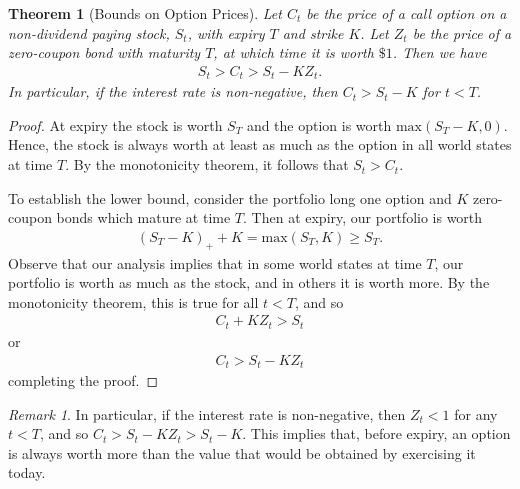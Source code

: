 \documentclass[12pt]{article}
\theoremstyle{plain}
\newtheorem{theorem}{Theorem}
\theoremstyle{definition}
\theoremstyle{remark}
\newtheorem*{remark}{Remark}
\numberwithin{equation}{section}  %
\begin{document}
\begin{theorem}[Bounds on Option Prices]\label{thm:bound-op-prices}
	Let $C_t$ be the price of a call option on a non-dividend paying stock, 
	$S_t$, with
	expiry $T$ and strike $K$. Let $Z_t$ be the price of a zero-coupon bond 
	with maturity $T$, at which time
	it is worth $\$1$. 
	Then we have
	\begin{equation*}
		\begin{split}
			S_{t} > C_{t} > S_{t} - K Z_{t}.
		\end{split}
	\end{equation*}
	In particular, if the interest rate is non-negative, then $C_{t} >
	S_{t} - K$ for $t < T$. 
\end{theorem}
\begin{proof}
	At expiry the stock is worth $S_{T}$ and the option is worth
	$\text{max}(S_{T} - K, 0)$. Hence, the stock is always worth at least as 
	much
	as the option in all world states at time $T$. By the monotonicity theorem, 
	it follows
	that $S_{t} > C_{t}$. 

	To establish the lower bound, consider the portfolio long one option and 
	$K$ zero-coupon bonds which
	mature at time $T$. Then at expiry, our portfolio is worth
	\begin{equation*}
		\begin{split}
			{(S_{T} - K)}_{+} + K =  \text{max}(S_{T}, K) \ge S_{T}.
		\end{split}
	\end{equation*}
	Observe that our analysis implies that in some world states at time $T$, 
	our portfolio is worth as much as the stock, and in others it is worth 
	more. By the monotonicity theorem, this is true for all $t < T$, and so
	\begin{equation*}
		\begin{split}
			C_{t} + K Z_{t} > S_{t} 
		\end{split}
	\end{equation*}
	or
	\begin{equation*}
		\begin{split}
			C_{t} > S_{t} - K Z_{t}
		\end{split}
	\end{equation*}
	completing the proof.
\end{proof}
\begin{remark}\label{rem:nev-ex}
	In particular, if the interest rate is non-negative, then $Z_{t} < 1$ for 
	any $t < T$, and so
	$C_{t} > S_{t} - KZ_{t} > S_{t} - K$.
	This implies that, before expiry, an option is always 
	worth more than the value that would be obtained by exercising it today.
\end{remark}
\end{document}
